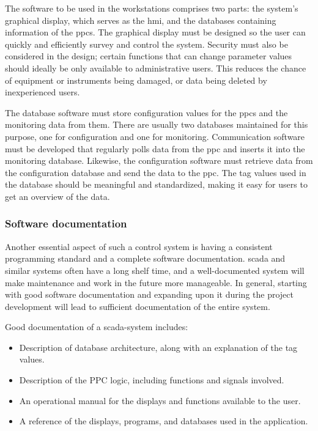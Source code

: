 \documentclass[main.tex]{subfiles}
\begin{document}
The software to be used in the workstations comprises two parts: the system's graphical display, which serves as the \gls{hmi}, and the databases containing information of the \gls{ppc}s. The graphical display must be designed so the user can quickly and efficiently survey and control the system. Security must also be considered in the design; certain functions that can change parameter values should ideally be only available to administrative users. This reduces the chance of equipment or instruments being damaged, or data being deleted by inexperienced users.

The database software must store configuration values for the \gls{ppc}s and the monitoring data from them. There are usually two databases maintained for this purpose, one for configuration and one for monitoring. Communication software must be developed that regularly polls data from the \gls{ppc} and inserts it into the monitoring database. Likewise, the configuration software must retrieve data from the configuration database and send the data to the \gls{ppc}. The tag values used in the database should be meaningful and standardized, making it easy for users to get an overview of the data.



\subsubsection{Software documentation}
Another essential aspect of such a control system is having a consistent programming standard and a complete software documentation. \gls{scada} and similar systems often have a long shelf time, and a well-documented system will make maintenance and work in the future more manageable. In general, starting with good software documentation and expanding upon it during the project development will lead to sufficient documentation of the entire system.

Good documentation of a \gls{scada}-system includes:

\begin{itemize}
    \item Description of database architecture, along with an explanation of the tag values.
    \item Description of the PPC logic, including functions and signals involved.
    \item An operational manual for the displays and functions available to the user.
    \item A reference of the displays, programs, and databases used in the application.
\end{itemize}
\end{document}
